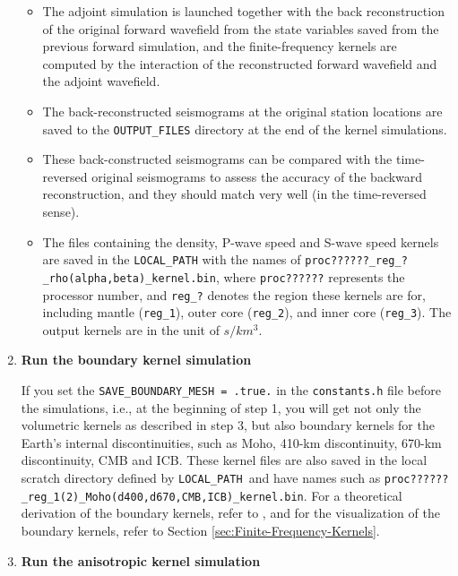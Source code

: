 \documentclass[oneside,english]{book}
\begin{document}
\begin{enumerate}
\begin{itemize}
\item The adjoint simulation is launched together with the back reconstruction
of the original forward wavefield from the state variables saved from
the previous forward simulation, and the finite-frequency kernels
are computed by the interaction of the reconstructed forward wavefield
and the adjoint wavefield.
\item The back-reconstructed seismograms at the original station locations
are saved to the \texttt{OUTPUT\_FILES} directory at the end of the
kernel simulations.
\item These back-constructed seismograms can be compared with the time-reversed
original seismograms to assess the accuracy of the backward reconstruction,
and they should match very well (in the time-reversed sense).
\item The files containing the density, P-wave speed and S-wave speed kernels
are saved in the \texttt{LOCAL\_PATH} with the names of \texttt{proc??????\_reg\_?\_rho(alpha,beta)\_kernel.bin},
where \texttt{proc??????} represents the processor number, and \texttt{reg\_?}
denotes the region these kernels are for, including mantle (\texttt{reg\_1}),
outer core (\texttt{reg\_2}), and inner core (\texttt{reg\_3}). The
output kernels are in the unit of $s/km^{3}$.
\end{itemize}
\item \textbf{Run the boundary kernel simulation}


\noindent If you set the \texttt{SAVE\_BOUNDARY\_MESH = .true.} in
the \texttt{constants.h} file before the simulations, i.e., at the
beginning of step 1, you will get not only the volumetric kernels
as described in step 3, but also boundary kernels for the Earth's
internal discontinuities, such as Moho, 410-km discontinuity, 670-km
discontinuity, CMB and ICB. These kernel files are also saved in the
local scratch directory defined by \texttt{LOCAL\_PATH }and have names
such as \texttt{proc??????\_reg\_1(2)\_Moho(d400,d670,CMB,ICB)\_kernel.bin}.
For a theoretical derivation of the boundary kernels, refer to \citet{TrTaLi05},
and for the visualization of the boundary kernels, refer to Section
\ref{sec:Finite-Frequency-Kernels}.

\item \textbf{Run the anisotropic kernel simulation}



\end{enumerate}
\end{document}
